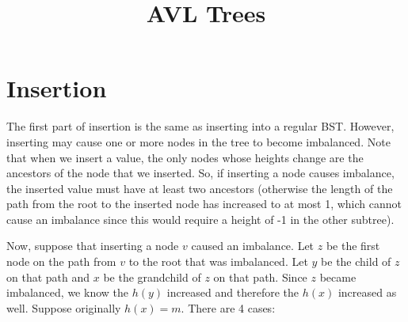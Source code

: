 \documentclass[12pt]{article}
\begin{document}
\title{AVL Trees}
\author{}
\maketitle


\section*{Insertion}
The first part of insertion is the same as inserting into a regular BST. However, inserting may cause one or more nodes in the tree to become imbalanced. Note that when we insert a value, the only nodes whose heights change are the ancestors of the node that we inserted. So, if inserting a node causes imbalance, the inserted value must have at least two ancestors (otherwise the length of the path from the root to the inserted node has increased to at most 1, which cannot cause an imbalance since this would require a height of -1 in the other subtree).

Now, suppose that inserting a node $v$ caused an imbalance. Let $z$ be the first node on the path from $v$ to the root that was imbalanced. Let $y$ be the child of $z$ on that path and $x$ be the grandchild of $z$ on that path. Since $z$ became imbalanced, we know the $h(y)$ increased and therefore the $h(x)$ increased as well. Suppose originally $h(x) = m$. There are 4 cases:
\end{document}

